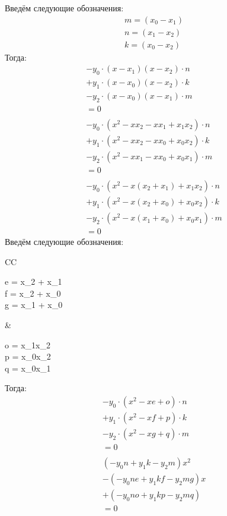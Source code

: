 \documentclass[a4paper]{article}
\begin{document}
Введём следующие обозначения:
\begin{align*}
    m = (x_0 - x_1) \\
    n = (x_1 - x_2) \\
    k = (x_0 - x_2)
\end{align*}
Тогда:
\begin{align*}
    - y_0 \cdot (x - x_1)(x - x_2) \cdot n \\
    + y_1 \cdot (x - x_0)(x - x_2) \cdot k \\
    - y_2 \cdot (x - x_0)(x - x_1) \cdot m \\
    = 0 \\
    \\
    - y_0 \cdot (x^2 - xx_2 - xx_1 + x_1x_2) \cdot n \\
    + y_1 \cdot (x^2 - xx_2 - xx_0 + x_0x_2) \cdot k \\
    - y_2 \cdot (x^2 - xx_1 - xx_0 + x_0x_1) \cdot m \\
    = 0 \\
    \\
    - y_0 \cdot (x^2 - x(x_2 + x_1) + x_1x_2) \cdot n \\
    + y_1 \cdot (x^2 - x(x_2 + x_0) + x_0x_2) \cdot k \\
    - y_2 \cdot (x^2 - x(x_1 + x_0) + x_0x_1) \cdot m \\
    = 0
\end{align*}
Введём следующие обозначения: \\
\begin{center}
    \begin{tabular}{CC}
        \begin{matrix}
            e = x_2 + x_1 \\
            f = x_2 + x_0 \\
            g = x_1 + x_0
        \end{matrix}
        &
        \begin{matrix}
            o = x_1x_2 \\
            p = x_0x_2 \\
            q = x_0x_1
        \end{matrix}
    \end{tabular}
\end{center}
Тогда:
\begin{align*}
    - y_0 \cdot (x^2 - xe + o) \cdot n \\
    + y_1 \cdot (x^2 - xf + p) \cdot k \\
    - y_2 \cdot (x^2 - xg + q) \cdot m \\
    = 0 \\
    \\
    (-y_0n + y_1k - y_2m)x^2 \\
    - (-y_0ne + y_1kf - y_2mg)x \\
    + (-y_0no + y_1kp - y_2mq) \\
    = 0 \\
\end{align*}
\end{document}
